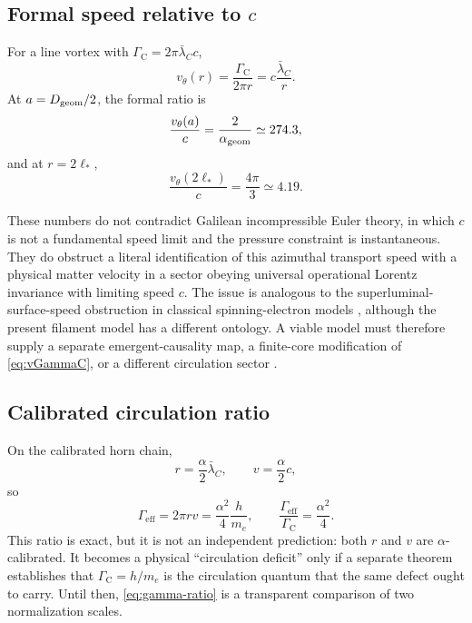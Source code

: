 \documentclass[aps,pre,preprint,notitlepage,nofootinbib,superscriptaddress]{revtex4-2}
\newcommand{\lC}{\bar\lambda_C}
\newcommand{\Gammaeff}{\Gamma_{\mathrm{eff}}}
\newcommand{\GammaC}{\Gamma_{\mathrm C}}
\begin{document}
\subsection{\texorpdfstring{Formal speed relative to \(c\)}{Formal speed relative to c}}

For a line vortex with \(\GammaC=2\pi\lC c\),
\begin{equation}
  v_\theta(r)
  =
  \frac{\GammaC}{2\pi r}
  =
  c\frac{\lC}{r}.
  \label{eq:vGammaC}
\end{equation}
At \(a=D_{\rm geom}/2\), the formal ratio is
\[
\frac{v_\theta(a)}{c}
=
\frac{2}{\alpha_{\rm geom}}
\simeq274.3,
\]
and at \(r=2\ell_*\),
\[
\frac{v_\theta(2\ell_*)}{c}
=
\frac{4\pi}{3}
\simeq4.19.
\]

These numbers do not contradict Galilean incompressible Euler theory, in which \(c\) is not a fundamental speed limit and the pressure constraint is instantaneous.  They do obstruct a literal identification of this azimuthal transport speed with a physical matter velocity in a sector obeying universal operational Lorentz invariance with limiting speed \(c\).  The issue is analogous to the superluminal-surface-speed obstruction in classical spinning-electron models \cite{Ohanian1986}, although the present filament model has a different ontology.  A viable model must therefore supply a separate emergent-causality map, a finite-core modification of \cref{eq:vGammaC}, or a different circulation sector \cite{BarceloLiberatiVisser2026}.

\subsection{Calibrated circulation ratio}

On the calibrated horn chain,
\begin{equation}
  r=\frac{\alpha}{2}\lC,
  \qquad
  v=\frac{\alpha}{2}c,
\end{equation}
so
\begin{equation}
  \Gammaeff
  =
  2\pi rv
  =
  \frac{\alpha^2}{4}\frac{h}{m_e},
  \qquad
  \boxed{
  \frac{\Gammaeff}{\GammaC}
  =
  \frac{\alpha^2}{4}
  }.
  \label{eq:gamma-ratio}
\end{equation}
This ratio is exact, but it is not an independent prediction: both \(r\) and \(v\) are \(\alpha\)-calibrated.  It becomes a physical ``circulation deficit'' only if a separate theorem establishes that \(\GammaC=h/m_e\) is the circulation quantum that the same defect ought to carry.  Until then, \cref{eq:gamma-ratio} is a transparent comparison of two normalization scales.
\end{document}
